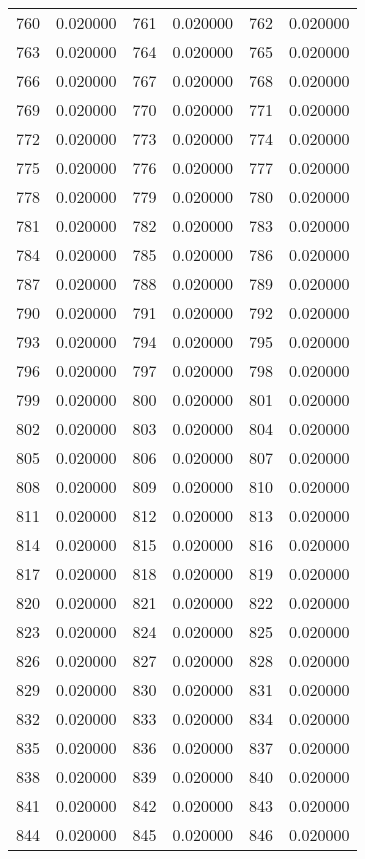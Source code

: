 \documentclass[12pt]{article}
\begin{document}
\begin{longtable}{@{}cc|cc|cc@{}}
760 & 0.020000 & 761 & 0.020000 & 762 & 0.020000 \\
763 & 0.020000 & 764 & 0.020000 & 765 & 0.020000 \\
766 & 0.020000 & 767 & 0.020000 & 768 & 0.020000 \\
769 & 0.020000 & 770 & 0.020000 & 771 & 0.020000 \\
772 & 0.020000 & 773 & 0.020000 & 774 & 0.020000 \\
775 & 0.020000 & 776 & 0.020000 & 777 & 0.020000 \\
778 & 0.020000 & 779 & 0.020000 & 780 & 0.020000 \\
781 & 0.020000 & 782 & 0.020000 & 783 & 0.020000 \\
784 & 0.020000 & 785 & 0.020000 & 786 & 0.020000 \\
787 & 0.020000 & 788 & 0.020000 & 789 & 0.020000 \\
790 & 0.020000 & 791 & 0.020000 & 792 & 0.020000 \\
793 & 0.020000 & 794 & 0.020000 & 795 & 0.020000 \\
796 & 0.020000 & 797 & 0.020000 & 798 & 0.020000 \\
799 & 0.020000 & 800 & 0.020000 & 801 & 0.020000 \\
802 & 0.020000 & 803 & 0.020000 & 804 & 0.020000 \\
805 & 0.020000 & 806 & 0.020000 & 807 & 0.020000 \\
808 & 0.020000 & 809 & 0.020000 & 810 & 0.020000 \\
811 & 0.020000 & 812 & 0.020000 & 813 & 0.020000 \\
814 & 0.020000 & 815 & 0.020000 & 816 & 0.020000 \\
817 & 0.020000 & 818 & 0.020000 & 819 & 0.020000 \\
820 & 0.020000 & 821 & 0.020000 & 822 & 0.020000 \\
823 & 0.020000 & 824 & 0.020000 & 825 & 0.020000 \\
826 & 0.020000 & 827 & 0.020000 & 828 & 0.020000 \\
829 & 0.020000 & 830 & 0.020000 & 831 & 0.020000 \\
832 & 0.020000 & 833 & 0.020000 & 834 & 0.020000 \\
835 & 0.020000 & 836 & 0.020000 & 837 & 0.020000 \\
838 & 0.020000 & 839 & 0.020000 & 840 & 0.020000 \\
841 & 0.020000 & 842 & 0.020000 & 843 & 0.020000 \\
844 & 0.020000 & 845 & 0.020000 & 846 & 0.020000 \\

\end{longtable}
\end{document}
